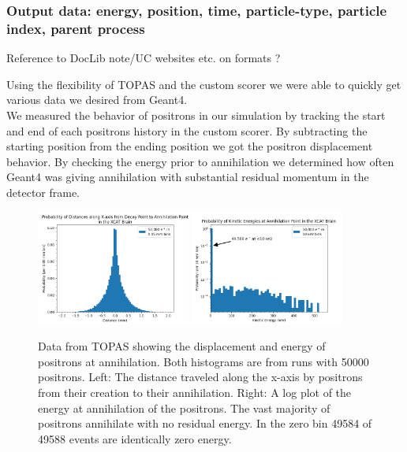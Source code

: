 \documentclass[12pt]{article}
\begin{document}
\subsubsection{Output data: energy, position, time, particle-type, particle index, parent process}

  Reference to DocLib note/UC websites etc. on formats ?

Using the flexibility of TOPAS and the custom scorer we were able to quickly get various data we desired from Geant4.\\

We measured the behavior of positrons in our simulation by tracking the start and end of each positrons history in the custom scorer. By subtracting the starting position from the ending position we got the positron displacement behavior. By checking the energy prior to annihilation we determined how often Geant4 was giving annihilation with substantial residual momentum in the detector frame.

\begin{figure}[!ht]
	\centering
	\includegraphics[width=0.45\textwidth]{Figures/xdist-v2.1.png}
	\hfil
	\includegraphics[width=0.45\textwidth]{Figures/finale_log-v2.1.png}
	\caption{Data from TOPAS showing the displacement and energy of positrons at annihilation. Both histograms are from runs with 50000 positrons. Left: The distance traveled along the x-axis by positrons from their creation to their annihilation. Right: A log plot of the energy at annihilation of the positrons. The vast majority of positrons annihilate with no residual energy. In the zero bin 49584 of 49588 events are identically zero energy.}
	\label{fig:positron_position_and_final_energy}
\end{figure}
\end{document}
